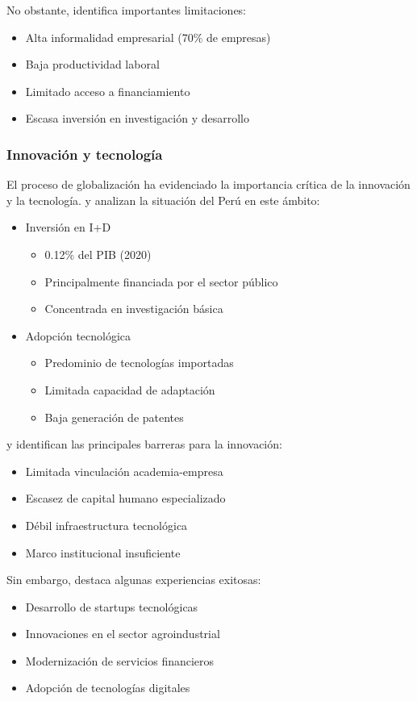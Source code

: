 \documentclass[12pt, a4paper]{article}
\begin{document}
No obstante, \cite{villarreal2019} identifica importantes limitaciones:
\begin{itemize}
    \item Alta informalidad empresarial (70\% de empresas)
    \item Baja productividad laboral
    \item Limitado acceso a financiamiento
    \item Escasa inversión en investigación y desarrollo
\end{itemize}

\subsubsection{Innovación y tecnología}
El proceso de globalización ha evidenciado la importancia crítica de la innovación y la tecnología. \cite{kuramoto2018} y \cite{sagasti2020} analizan la situación del Perú en este ámbito:

\begin{itemize}
    \item Inversión en I+D
    \begin{itemize}
        \item 0.12\% del PIB (2020)
        \item Principalmente financiada por el sector público
        \item Concentrada en investigación básica
    \end{itemize}
    
    \item Adopción tecnológica
    \begin{itemize}
        \item Predominio de tecnologías importadas
        \item Limitada capacidad de adaptación
        \item Baja generación de patentes
    \end{itemize}
\end{itemize}

\cite{peters2021} y \cite{martinez2020} identifican las principales barreras para la innovación:
\begin{itemize}
    \item Limitada vinculación academia-empresa
    \item Escasez de capital humano especializado
    \item Débil infraestructura tecnológica
    \item Marco institucional insuficiente
\end{itemize}

Sin embargo, \cite{loayza2019} destaca algunas experiencias exitosas:
\begin{itemize}
    \item Desarrollo de startups tecnológicas
    \item Innovaciones en el sector agroindustrial
    \item Modernización de servicios financieros
    \item Adopción de tecnologías digitales
\end{itemize}
\end{document}
